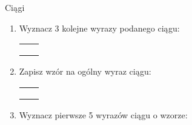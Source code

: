 \documentclass[12pt,a4paper]{article}
\begin{document}
	\begin{center}
		\LARGE Ciągi
	\end{center}
	\vspace{1cm}
	
	
	\begin{enumerate}[1.]
		\item Wyznacz 3 kolejne wyrazy podanego ciągu:
		
		\begin{enumerate}[a)] \begin{tabular}{p{7cm} p{7cm}} 
				\item $1,-2,3,-4,5,-6,\dots $& \vspace{0.4cm} \item $5,7,9,11,13,15,\dots $ \\
				\item $0,0,0,0,0,0,\dots $& \item $0,1,1,2,3,5,8,\dots $ \\
				\item $0,\frac{1}{2},\frac{2}{3},\frac{3}{4},\frac{4}{5},\dots $& \item $1,2,4,8,16,32,\dots $ \\
		\end{tabular} \end{enumerate}
	
		\item Zapisz wzór na ogólny wyraz ciągu:
	
		\begin{enumerate}[a)] \begin{tabular}{p{7cm} p{7cm}} 
			\item $1,2,3,4,5,6,\dots $& \vspace{0.4cm} \item $\frac{1}{2},\frac{1}{4},\frac{1}{6},\frac{1}{8},\frac{1}{10},\dots $ \\
			\item $3,6,9,12,15,18,\dots $& \item $5,3,1,-1,-3,-5,\dots $ \\
			\item $1,-1,1,-1,1,-1,\dots $& \item $1,4,9,16,25,36,\dots $ \\
		\end{tabular} \end{enumerate}
		
		\item Wyznacz pierwsze 5 wyrazów ciągu o wzorze:
		

\end{enumerate}
\end{document}
